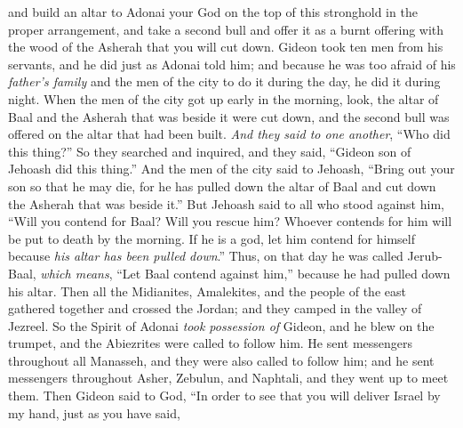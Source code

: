 \begin{biblechapter}
\verse and build an altar to Adonai your God on the top of this stronghold in the proper arrangement, and take a second bull and offer it as a burnt offering with the wood of the Asherah that you will cut down.
\verse Gideon took ten men from his servants, and he did just as Adonai told him; and because he was too afraid of his \textit{father’s family} and the men of the city to do it during the day, he did it during night.
 When the men of the city got up early in the morning, look, the altar of Baal and the Asherah that was beside it were cut down, and the second bull was offered on the altar that had been built.
\verse \textit{And they said to one another}, “Who did this thing?” So they searched and inquired, and they said, “Gideon son of Jehoash did this thing.”
\verse And the men of the city said to Jehoash, “Bring out your son so that he may die, for he has pulled down the altar of Baal and cut down the Asherah that was beside it.”
\verse But Jehoash said to all who stood against him, “Will you contend for Baal? Will you rescue him? Whoever contends for him will be put to death by the morning. If he is a god, let him contend for himself because \textit{his altar has been pulled down}.”
\verse Thus, on that day he was called Jerub-Baal, \textit{which means}, “Let Baal contend against him,” because he had pulled down his altar.
\verse Then all the Midianites, Amalekites, and the people of the east gathered together and crossed the Jordan; and they camped in the valley of Jezreel.
\verse So the Spirit of Adonai \textit{took possession of} Gideon, and he blew on the trumpet, and the Abiezrites were called to follow him.
\verse He sent messengers throughout all Manasseh, and they were also called to follow him; and he sent messengers throughout Asher, Zebulun, and Naphtali, and they went up to meet them.
 Then Gideon said to God, “In order to see that you will deliver Israel by my hand, just as you have said,

\end{biblechapter}
